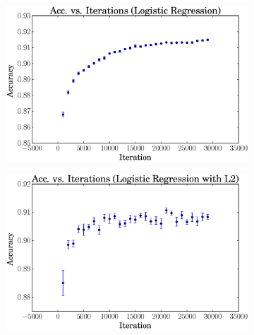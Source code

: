 \documentclass[a4paper, 12pt]{article}
\begin{document}
\begin{figure}[htpb]
\begin{subfigure}[htpb]{0.45\textwidth}
        \includegraphics[width=\textwidth]{acc_vs_iterations_logreg}
        \caption{}
        \label{fig:gwd}
    \end{subfigure}
    \begin{subfigure}[htpb]{0.45\textwidth}
        \includegraphics[width=\textwidth]{acc_vs_iterations_logregL2}
        \caption{}
        \label{fig:bwd}
    \end{subfigure}
    \caption{}\label{fig:viz}
\end{figure}
\end{document}
